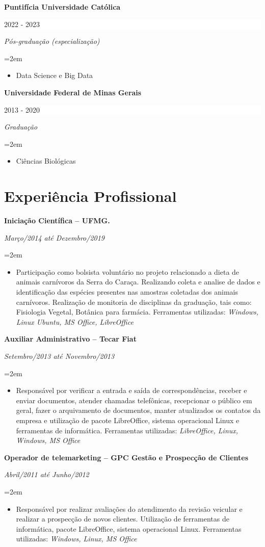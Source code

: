 \documentclass[paper=a4,fontsize=11pt]{scrartcl} %
\newcommand{\NewPart}[1]{\section*{{#1}}}
\newcommand{\EducationEntry}[4]{
		\noindent \textbf{#1} \hfill      %
		\colorbox{White}{%
			\parbox{5cm}{%
			\hfill\color{Black}#2}} \par  %
		\noindent \textit{#3} \par        %
		\noindent\hangindent=2em\hangafter=0 \small #4 %
		\normalsize \par}
\begin{document}
\EducationEntry{Puntifícia Universidade Católica}{2022 - 2023}{Pós-graduação (especialização)}{
	\begin{itemize}
		\item{Data Science e Big Data }

	\end{itemize}
}

\EducationEntry{Universidade Federal de Minas Gerais}{2013 - 2020}{Graduação}{
	\begin{itemize}
		\item{Ciências Biológicas }

	\end{itemize}
}

\NewPart{Experiência Profissional}{}

\EducationEntry{Iniciação Científica – UFMG.}{}{Março/2014 até Dezembro/2019}{
	\begin{itemize}
		\item{Participação como bolsista voluntário no projeto relacionado a dieta de 
		animais carnívoros da Serra do Caraça. Realizando coleta e analise de dados e 
		identificação das espécies presentes nas amostras coletadas dos animais 
		carnívoros. Realização de monitoria de disciplinas da graduação, tais como: 
		Fisiologia Vegetal, Botânica para farmácia. Ferramentas utilizadas: \newline \newline 
		      \textit{Windows, Linux Ubuntu, MS Office, LibreOffice}}

	\end{itemize}
}

\EducationEntry{Auxiliar Administrativo – Tecar Fiat}{}{Setembro/2013 até Novembro/2013}{
	\begin{itemize}
		\item{Responsável por verificar a entrada e saída de correspondências, receber e 
		enviar documentos, atender chamadas telefônicas, recepcionar o público em geral, 
		fazer o arquivamento de documentos, manter atualizados os contatos da empresa e 
		utilização de pacote LibreOffice, sistema operacional Linux e ferramentas de 
		informática. Ferramentas utilizadas: \newline \newline
		      \textit{LibreOffice, Linux, Windows, MS Office}}

	\end{itemize}
}

\EducationEntry{Operador de telemarketing – GPC Gestão e Prospecção de Clientes}{}{Abril/2011 até Junho/2012}{
	\begin{itemize}
		\item{Responsável por realizar avaliações do atendimento da revisão veicular e realizar a
		prospecção de novos clientes. Utilização de ferramentas de informática, pacote LibreOffice,
		 sistema operacional Linux. Ferramentas utilizadas:\newline \newline
		      \textit{Windows, Linux, MS Office}}

	\end{itemize}
}
\end{document}
